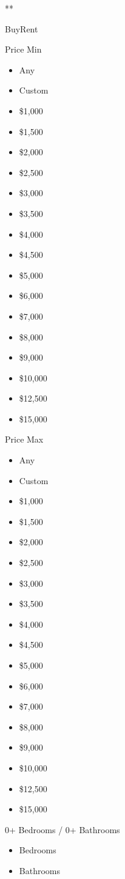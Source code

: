 **

BuyRent

Price Min

\begin{itemize}
\tightlist
\item
  Any
\item
  Custom
\item
  \$1,000
\item
  \$1,500
\item
  \$2,000
\item
  \$2,500
\item
  \$3,000
\item
  \$3,500
\item
  \$4,000
\item
  \$4,500
\item
  \$5,000
\item
  \$6,000
\item
  \$7,000
\item
  \$8,000
\item
  \$9,000
\item
  \$10,000
\item
  \$12,500
\item
  \$15,000
\end{itemize}

Price Max

\begin{itemize}
\tightlist
\item
  Any
\item
  Custom
\item
  \$1,000
\item
  \$1,500
\item
  \$2,000
\item
  \$2,500
\item
  \$3,000
\item
  \$3,500
\item
  \$4,000
\item
  \$4,500
\item
  \$5,000
\item
  \$6,000
\item
  \$7,000
\item
  \$8,000
\item
  \$9,000
\item
  \$10,000
\item
  \$12,500
\item
  \$15,000
\end{itemize}

0+ Bedrooms / 0+ Bathrooms

\begin{itemize}
\tightlist
\item
  Bedrooms
\item
  Bathrooms
\end{itemize}

